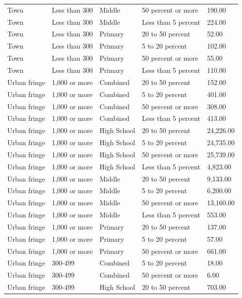\documentclass[
  man, fleqn, noextraspace]{apa6}
\begin{document}
\begin{table}[tbp]
\begin{center}
\begin{threeparttable}
\begin{tabular}{lllll}
Town & Less than 300 & Middle & 50 percent or more & 190.00\\
Town & Less than 300 & Middle & Less than 5 percent & 224.00\\
Town & Less than 300 & Primary & 20 to 50 percent & 52.00\\
Town & Less than 300 & Primary & 5 to 20 percent & 102.00\\
Town & Less than 300 & Primary & 50 percent or more & 55.00\\
Town & Less than 300 & Primary & Less than 5 percent & 110.00\\
Urban fringe & 1,000 or more & Combined & 20 to 50 percent & 152.00\\
Urban fringe & 1,000 or more & Combined & 5 to 20 percent & 401.00\\
Urban fringe & 1,000 or more & Combined & 50 percent or more & 308.00\\
Urban fringe & 1,000 or more & Combined & Less than 5 percent & 413.00\\
Urban fringe & 1,000 or more & High School & 20 to 50 percent & 24,226.00\\
Urban fringe & 1,000 or more & High School & 5 to 20 percent & 24,735.00\\
Urban fringe & 1,000 or more & High School & 50 percent or more & 25,739.00\\
Urban fringe & 1,000 or more & High School & Less than 5 percent & 4,823.00\\
Urban fringe & 1,000 or more & Middle & 20 to 50 percent & 9,133.00\\
Urban fringe & 1,000 or more & Middle & 5 to 20 percent & 6,200.00\\
Urban fringe & 1,000 or more & Middle & 50 percent or more & 13,160.00\\
Urban fringe & 1,000 or more & Middle & Less than 5 percent & 553.00\\
Urban fringe & 1,000 or more & Primary & 20 to 50 percent & 137.00\\
Urban fringe & 1,000 or more & Primary & 5 to 20 percent & 57.00\\
Urban fringe & 1,000 or more & Primary & 50 percent or more & 661.00\\
Urban fringe & 300-499 & Combined & 5 to 20 percent & 18.00\\
Urban fringe & 300-499 & Combined & 50 percent or more & 6.00\\
Urban fringe & 300-499 & High School & 20 to 50 percent & 703.00\\

\end{tabular}
\end{threeparttable}
\end{center}
\end{table}
\end{document}
